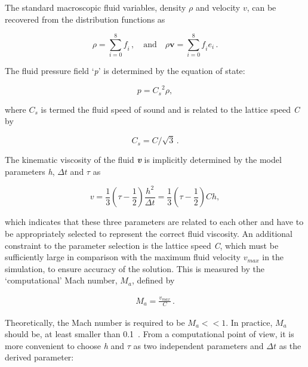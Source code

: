 The standard macroscopic fluid variables, density $\rho$ and velocity 
$\mathbf{\mathit{ v}}$, can be recovered from the distribution functions as

\begin{equation}
	\rho = \sum\limits_{\mathit{i}=0}^{8}{\mathit{f_i}}\,, \quad \mbox{and} 
	\quad \rho \mathbf{v} 
	= \sum\limits_{\mathit{i}=0}^{8}{\mathit{f_i}}\mathbf{\mathit{e_i}}\,.
\end{equation}

The fluid pressure field `\textit{p}' is determined by the equation of 
state:

\begin{equation}
	\mathit{p}=\mathit{C_s}^{2} \rho,
\end{equation}

\noindent where $\mathit{C_s}$ is termed the fluid speed of sound and is 
related to the lattice speed \textit{C} by

\begin{equation}
	\mathit{C_s}=\mathit{C}/\sqrt{3}\,.
\end{equation}

The kinematic viscosity of the fluid \textbf{\textit{v}} is implicitly 
determined by the model parameters \textit{h}, $\Delta \mathit{t}$ and $\tau$ 
as

\begin{equation}
	\mathit{v}=\frac{1}{3}(\tau - \frac{1}{2})\frac{\mathit{h}^{2}}{\Delta 
	\mathit{t}} = \frac{1}{3}(\tau - \frac{1}{2})\mathit{Ch},
\end{equation}

\noindent which indicates that these three parameters are related to each other 
and have to be appropriately selected to represent the correct fluid viscosity. 
An additional constraint to the parameter selection is the lattice speed 
\textit{C}, which must be sufficiently large in comparison with the maximum 
fluid velocity $\mathit{v}_{\mathit{max}}$ in the simulation, to ensure 
accuracy of the solution. This is measured by the `computational' Mach number, 
$\mathit{M}_{\mathit{a}}$, defined by

\begin{align}
	\mathit{M}_{\mathit{a}}=\frac{\mathit{v}_{\mathit{max}}}{\mathit{C}}\,.
\end{align}

Theoretically, the Mach number is required to be $\mathit{M}_{\mathit{a}}<< 1$. 
In practice, $\mathit{M}_{\mathit{a}}$ should be, at least smaller than 
0.1~\citep{He1997}. From a computational point of view, it is more convenient 
to choose \textit{h} and $\tau$ as two independent parameters and $\Delta 
\mathit{t}$ as the derived parameter:

